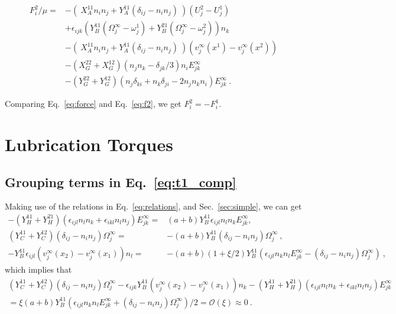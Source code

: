 \documentclass[reprint, amsmath,amssymb,aps,pre,onecolumn,notitlepage%
]{revtex4-1}
\begin{document}
\begin{equation}
	\begin{split}
		F^2_i/\mu=& -(\ X_A^{11}n_in_j+Y_A^{11}(\delta_{ij}-n_in_j)\ )(U^2_j-U^1_j)\\
		&+\epsilon_{ijk} \left(Y_B^{11}(\Omega_j^\infty-\omega_j^1)+Y_B^{21}(\Omega_j^\infty-\omega_j^2)\right) n_k\\
& -(\ X_A^{11}n_in_j+Y_A^{11}(\delta_{ij}-n_in_j)\ )(v_j^\infty(x^1)-v_j^\infty(x^2))\\
		&-(X_G^{22}+X_G^{12})(n_jn_k-\delta_{jk}/3)n_iE^\infty_{jk}\\
		&-(Y_G^{22}+Y_G^{12})(n_j\delta_{ki}+n_k\delta_{ji}-2n_jn_kn_i)E^\infty_{jk}\ . 
	\end{split}
	\label{eq:f2}
\end{equation}

Comparing Eq.~\eqref{eq:force} and Eq.~\eqref{eq:f2}, we get $\boxed{F_i^2=-F_i^1}$.
\newpage
\section{Lubrication Torques}
\subsection{Grouping terms in Eq.~\eqref{eq:t1_comp}}
Making use of the relations in Eq.~\eqref{eq:relations}, and Sec.~\ref{sec:simple}, we can get
\begin{equation}
\begin{split}
- (Y^{11}_H+Y^{21}_H)(\epsilon_{ijl} n_l n_k+\epsilon_{ikl} n_l n_j) E^\infty_{jk}=&(a+b)Y_B^{11}\epsilon_{ijl} n_l n_k E^\infty_{jk},\\
(Y_C^{11}+Y_C^{12})(\delta_{ij}-n_in_j)\Omega_j^\infty =&-(a+b)Y_B^{11}(\delta_{ij}-n_in_j)\Omega_j^\infty \ ,\\
-Y_B^{11}\epsilon_{ijl}(v^\infty_j(x_2)-v^\infty_j(x_1))n_l=&-(a+b)(1+\xi/2)Y_B^{11}\left(\epsilon_{ijl}n_k n_l E^\infty_{jk}- (\delta_{ij}- n_i n_j)\Omega^\infty_j  \right)\ ,
\end{split}
\end{equation}
which implies that
\begin{equation}
	\begin{split}
(Y_C^{11}+Y_C^{12})(\delta_{ij}-n_in_j)\Omega_j^\infty -\epsilon_{ijk}Y_B^{11}(v^\infty_j(x_2)-v^\infty_j(x_1))n_k - (Y^{11}_H+Y^{21}_H)(\epsilon_{ijl} n_l n_k+\epsilon_{ikl} n_l n_j) E^\infty_{jk}\\= \xi (a+b) Y_B^{11}\left(\epsilon_{ijl}n_k n_l E^\infty_{jk}+ (\delta_{ij}- n_i n_j)\Omega^\infty_j  \right)/2 =\mathcal{O}(\xi)\approx 0 \ .
\end{split}
\end{equation}
\end{document}
